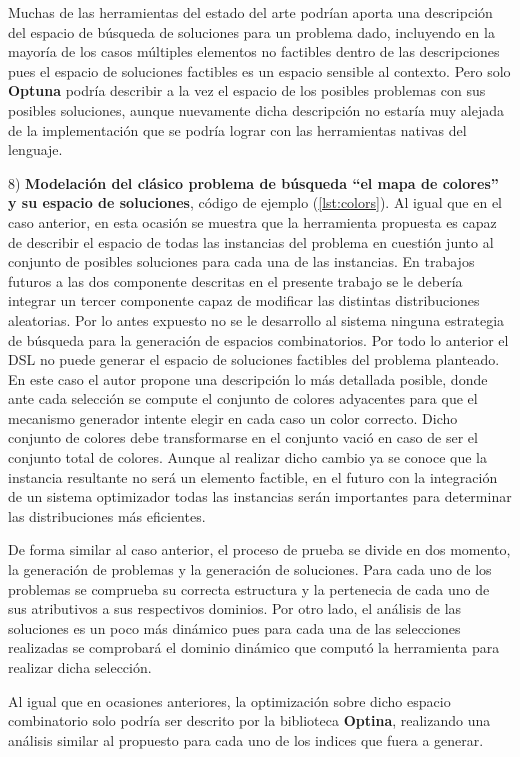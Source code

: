 Muchas de las herramientas del estado del arte podrían aporta una descripción del espacio de búsqueda de soluciones para un problema
dado, incluyendo en la mayoría de los casos múltiples elementos no factibles dentro de las descripciones pues el espacio de
soluciones factibles es un espacio sensible al contexto. Pero solo {\bf Optuna} podría describir a la vez el espacio de los posibles
problemas con sus posibles soluciones, aunque nuevamente dicha descripción no estaría muy alejada de la implementación que se podría
lograr con las herramientas nativas del lenguaje.

8) {\bf Modelación del clásico problema de búsqueda “el mapa de colores” y su espacio de soluciones}, código de ejemplo (\ref{lst:colors}). Al igual que en el caso anterior,
en esta ocasión se muestra que la herramienta propuesta es capaz de describir el espacio de todas las instancias del problema en
cuestión junto al conjunto de posibles soluciones para cada una de las instancias. En trabajos futuros a las dos componente descritas
en el presente trabajo se le debería integrar un tercer componente capaz de modificar las distintas distribuciones aleatorias. Por
lo antes expuesto no se le desarrollo al sistema ninguna estrategia de búsqueda para la generación de espacios combinatorios. Por
todo lo anterior el DSL no puede generar el espacio de soluciones factibles del problema planteado. En este caso el autor propone
una descripción lo más detallada posible, donde ante cada selección se compute el conjunto de colores adyacentes para que el mecanismo
generador intente elegir en cada caso un color correcto. Dicho conjunto de colores debe transformarse en el conjunto vació en caso de
ser el conjunto total de colores. Aunque al realizar dicho cambio ya se conoce que la instancia resultante no será un elemento factible,
en el futuro con la integración de un sistema optimizador todas las instancias serán importantes para determinar las distribuciones
más eficientes.

De forma similar al caso anterior, el proceso de prueba se divide en dos momento, la generación de problemas y la generación de
soluciones. Para cada uno de los problemas se comprueba su correcta estructura y la pertenecia de cada uno de sus atributivos a sus
respectivos dominios. Por otro lado, el análisis de las soluciones es un poco más dinámico pues para cada una de las selecciones
realizadas se comprobará el dominio dinámico que computó la herramienta para realizar dicha selección.

Al igual que en ocasiones anteriores, la optimización sobre dicho espacio combinatorio solo podría ser descrito por la biblioteca
      {\bf Optina}, realizando una análisis similar al propuesto para cada uno de los indices que fuera a generar.

